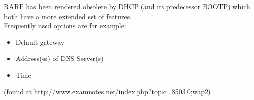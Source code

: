 RARP has been rendered obsolete by DHCP (and its predecessor BOOTP) which both have a more extended set of features.\\
Frequently used options are for example:
\begin{itemize}
\item Default gateway
\item Address(es) of DNS Server(s)
\item Time
\end{itemize}
(found at http://www.examnotes.net/index.php?topic=8503.0;wap2)